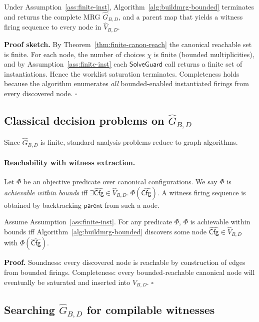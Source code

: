 \documentclass[runningheads]{llncs}
\newcommand{\Cfg}{\mathsf{Cfg}}
\newcommand{\SolveGuard}{\mathsf{SolveGuard}}
\begin{document}
\begin{theorem}
\label{thm:mrg-bounded-term-comp}
Under Assumption~\ref{ass:finite-inst}, Algorithm~\ref{alg:buildmrg-bounded} terminates and returns
the complete MRG $\widehat{G}_{B,D}$, and a parent map that yields a witness firing sequence
to every node in $\widehat{V}_{B,D}$.
\end{theorem}
\noindent\textbf{Proof sketch.}
By Theorem~\ref{thm:finite-canon-reach} the canonical reachable set is finite.
For each node, the number of choices $\chi$ is finite (bounded multiplicities), and by Assumption~\ref{ass:finite-inst}
each $\SolveGuard$ call returns a finite set of instantiations. Hence the worklist saturation terminates.
Completeness holds because the algorithm enumerates \emph{all} bounded-enabled instantiated firings from every discovered node.
\hfill $\square$

\subsection{Classical decision problems on $\widehat{G}_{B,D}$}
\label{sec:analysis:classic2}

Since $\widehat{G}_{B,D}$ is finite, standard analysis problems reduce to graph algorithms.

\paragraph{Reachability with witness extraction.}
Let $\Phi$ be an objective predicate over canonical configurations.
We say $\Phi$ is \emph{achievable within bounds} iff
$\exists \widehat{\Cfg}\in \widehat{V}_{B,D}.\ \Phi(\widehat{\Cfg})$.
A witness firing sequence is obtained by backtracking $\mathsf{parent}$ from such a node.

\begin{theorem}
\label{thm:bounded-reachability}
Assume Assumption~\ref{ass:finite-inst}. For any predicate $\Phi$,
$\Phi$ is achievable within bounds iff Algorithm~\ref{alg:buildmrg-bounded} discovers some node
$\widehat{\Cfg}\in\widehat{V}_{B,D}$ with $\Phi(\widehat{\Cfg})$.
\end{theorem}
\noindent\textbf{Proof.}
Soundness: every discovered node is reachable by construction of edges from bounded firings.
Completeness: every bounded-reachable canonical node will eventually be saturated and inserted into $\widehat{V}_{B,D}$.
\hfill $\square$

\subsection{Searching $\widehat{G}_{B,D}$ for compilable witnesses}
\label{sec:analysis:classic2}
\end{document}
